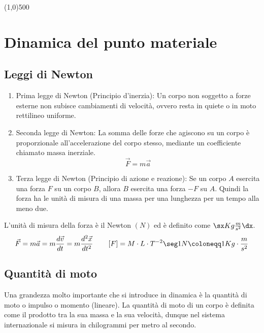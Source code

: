 \line(1,0){500}
\chapter{Dinamica del punto materiale}



\section{Leggi di Newton}




\begin{enumerate}
\item Prima legge di Newton (Principio d'inerzia): Un corpo non soggetto a forze esterne non subisce cambiamenti di velocità, ovvero resta in quiete o in moto rettilineo uniforme.
\item Seconda legge di Newton: La somma delle forze che agiscono su un corpo è proporzionale all'accelerazione del corpo stesso, mediante un coefficiente chiamato massa inerziale.\\
\begin{equation}
\boxed{\vec F = m\vec a}
\end{equation}
\item Terza legge di Newton (Principio di azione e reazione): Se un corpo $A$ esercita una forza $F$ su un corpo $B$, allora $B$ esercita una forza $-F$ su $A$.
Quindi la forza ha le unità di misura di una massa per una lunghezza per un tempo alla meno due.

\end{enumerate}

L'unità di misura della forza è il Newton $(N)$ ed è definito come $\sx Kg\frac m{s^2}\dx$. 
$$ \vec F = m\vec a = m\frac{d\vec v}{dt} = m\frac{d^2\vec x}{dt^2}\quad\quad \left[F\right] = M\cdot L\cdot T^{-2} \seg 1N \coloneqq 1 Kg\cdot\frac m{s^2}$$




\section{Quantità di moto}
Una grandezza molto importante che si introduce in dinamica è la quantità di moto o impulso o momento (lineare). La quantità di moto di un corpo è definita come il prodotto tra la sua massa e la sua velocità, dunque nel sistema internazionale si misura in chilogrammi per metro al secondo. 




